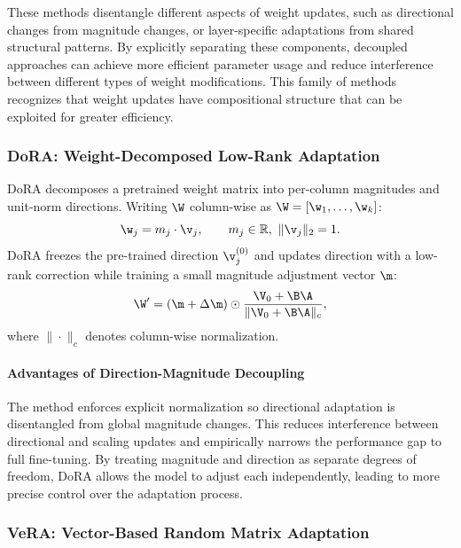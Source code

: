 These methods disentangle different aspects of weight updates, such as directional changes from magnitude changes, or layer-specific adaptations from shared structural patterns. By explicitly separating these components, decoupled approaches can achieve more efficient parameter usage and reduce interference between different types of weight modifications. This family of methods recognizes that weight updates have compositional structure that can be exploited for greater efficiency.

\subsubsection{DoRA: Weight-Decomposed Low-Rank Adaptation}
\label{subsubsec:dora}

DoRA decomposes a pretrained weight matrix into per-column magnitudes and unit-norm directions. Writing $\W$ column-wise as $\W=[\w_1,\dots,\w_k]$:
\begin{equation}
  \w_j = m_j \cdot \v_j,\qquad m_j\in\mathbb{R},\ \|\v_j\|_2=1.
\end{equation}
DoRA freezes the pre-trained direction $\v_{j}^{(0)}$ and updates direction with a low-rank correction while training a small magnitude adjustment vector $\m$:
\begin{equation}
  \W' = (\m + \Delta\m) \odot \frac{\V_0 + \B\A}{\|\V_0 + \B\A\|_c},
\end{equation}
where $\|\cdot\|_c$ denotes column-wise normalization.

\paragraph{Advantages of Direction-Magnitude Decoupling}
The method enforces explicit normalization so directional adaptation is disentangled from global magnitude changes. This reduces interference between directional and scaling updates and empirically narrows the performance gap to full fine-tuning. By treating magnitude and direction as separate degrees of freedom, DoRA allows the model to adjust each independently, leading to more precise control over the adaptation process.

\subsubsection{VeRA: Vector-Based Random Matrix Adaptation}
\label{subsubsec:vera}

